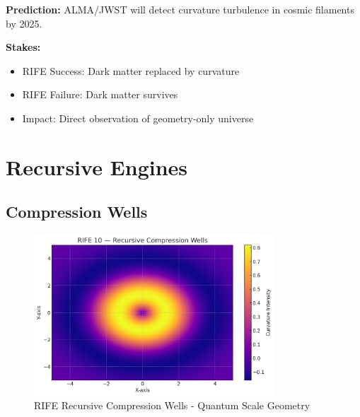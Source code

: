 \documentclass[11pt]{report}
\begin{document}
\textbf{Prediction:} ALMA/JWST will detect curvature turbulence in cosmic filaments by 2025.

\textbf{Stakes:}
\begin{itemize}
\item RIFE Success: Dark matter replaced by curvature
\item RIFE Failure: Dark matter survives
\item Impact: Direct observation of geometry-only universe
\end{itemize}

\section{Recursive Engines}

\subsection{Compression Wells}
\begin{figure}[ht]
  \centering
  \includegraphics[width=0.8\textwidth]{recursive_engines/compression_wells.png}
  \caption{RIFE Recursive Compression Wells - Quantum Scale Geometry}
\end{figure}
\end{document}
